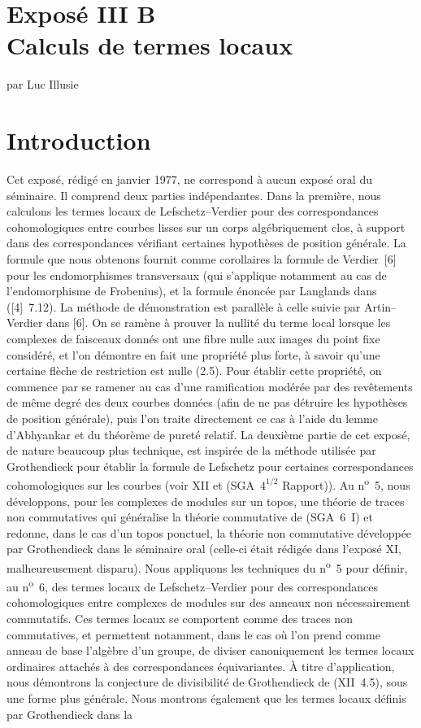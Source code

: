\documentclass[11pt]{article}
\begin{document}
\clearpage
\section*{Exposé III B\\Calculs de termes locaux}
\begin{center}
par Luc Illusie
\end{center}

\section*{Introduction}

Cet exposé, rédigé en janvier 1977, ne correspond à aucun exposé oral du séminaire. Il comprend deux parties indépendantes. Dans la première, nous calculons les termes locaux de Lefschetz--Verdier pour des correspondances cohomologiques entre courbes lisses sur un corps algébriquement clos, à support dans des correspondances vérifiant certaines hypothèses de position générale. La formule que nous obtenons fournit comme corollaires la formule de Verdier~[6] pour les endomorphismes transversaux (qui s'applique notamment au cas de l'endomorphisme de Frobenius), et la formule énoncée par Langlands dans ([4]~7.12). La méthode de démonstration est parallèle à celle suivie par Artin--Verdier dans [6]. On se ramène à prouver la nullité du terme local lorsque les complexes de faisceaux donnés ont une fibre nulle aux images du point fixe considéré, et l'on démontre en fait une propriété plus forte, à savoir qu'une certaine flèche de restriction est nulle (2.5). Pour établir cette propriété, on commence par se ramener au cas d'une ramification modérée par des revêtements de même degré des deux courbes données (afin de ne pas détruire les hypothèses de position générale), puis l'on traite directement ce cas à l'aide du lemme d'Abhyankar et du théorème de pureté relatif. La deuxième partie de cet exposé, de nature beaucoup plus technique, est inspirée de la méthode utilisée par Grothendieck pour établir la formule de Lefschetz pour certaines correspondances cohomologiques sur les courbes (voir XII et (SGA~$4^{1/2}$ Rapport)). Au n\textsuperscript{o}~5, nous développons, pour les complexes de modules sur un topos, une théorie de traces non commutatives qui généralise la théorie commutative de (SGA~6~I) et redonne, dans le cas d'un topos ponctuel, la théorie non commutative développée par Grothendieck dans le séminaire oral (celle-ci était rédigée dans l'exposé XI, malheureusement disparu). Nous appliquons les techniques du n\textsuperscript{o}~5 pour définir, au n\textsuperscript{o}~6, des termes locaux de Lefschetz--Verdier pour des correspondances cohomologiques entre complexes de modules sur des anneaux non nécessairement commutatifs. Ces termes locaux se comportent comme des traces non commutatives, et permettent notamment, dans le cas où l'on prend comme anneau de base l'algèbre d'un groupe, de diviser canoniquement les termes locaux ordinaires attachés à des correspondances équivariantes. À titre d'application, nous démontrons la conjecture de divisibilité de Grothendieck de (XII~4.5), sous une forme plus générale. Nous montrons également que les termes locaux définis par Grothendieck dans la 
\end{document}

